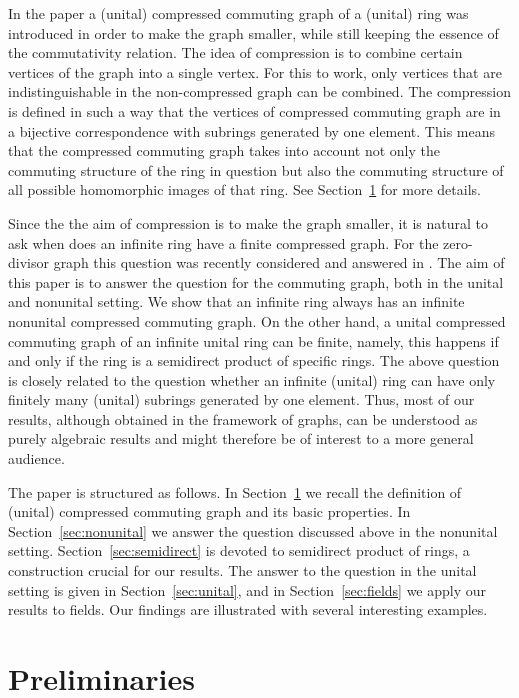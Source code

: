 \documentclass[12pt,a4paper]{amsart}
\theoremstyle{definition}
\begin{document}
In the paper \cite{BoDoKoSt23} a (unital) compressed commuting graph of a (unital) ring was introduced in order to make the graph smaller,
while still keeping the essence of the commutativity relation. 
The idea of compression is to combine certain vertices of the graph into a single vertex. For this to work, only vertices that are indistinguishable in the non-compressed graph can be combined. 
The compression is defined in such a way that the vertices of compressed commuting graph are in a bijective correspondence with subrings generated by one element. 
This means that the compressed commuting graph
takes into account not only the commuting structure of the ring in question but also the commuting structure of all possible homomorphic images of that ring. See Section~\ref{sec:prelim} for more details.

Since the the aim of compression is to make the graph smaller, it is natural to ask when does an infinite ring have a finite compressed graph.   
For the zero-divisor graph this question was recently considered and answered in \cite{SbZa23}. 
The aim of this paper is to answer the question for the commuting graph, both in the unital and nonunital setting. 
We show that an infinite ring always has an infinite nonunital compressed commuting graph. 
On the other hand, a unital compressed commuting graph of an infinite unital ring can be finite, namely, this happens if and only if the ring is a semidirect product of specific rings. 
The above question is closely related to the question whether an infinite (unital) ring can have only finitely many (unital) subrings generated by one element. Thus, most of our results, although obtained in the framework of graphs, can be understood as purely algebraic results and might therefore be of interest to a more general audience. 

The paper is structured as follows. In Section~\ref{sec:prelim} we recall the definition of (unital) compressed commuting graph and its basic properties. 
In Section~\ref{sec:nonunital} we answer the question discussed above in the nonunital setting. 
Section~\ref{sec:semidirect} is devoted to semidirect product of rings, a construction  crucial for our results. 
The answer to the question in the unital setting is given in Section~\ref{sec:unital}, and in Section~\ref{sec:fields} we apply our results to fields. 
Our findings are illustrated  with several interesting examples. 


\section{Preliminaries} \label{sec:prelim}
\end{document}
